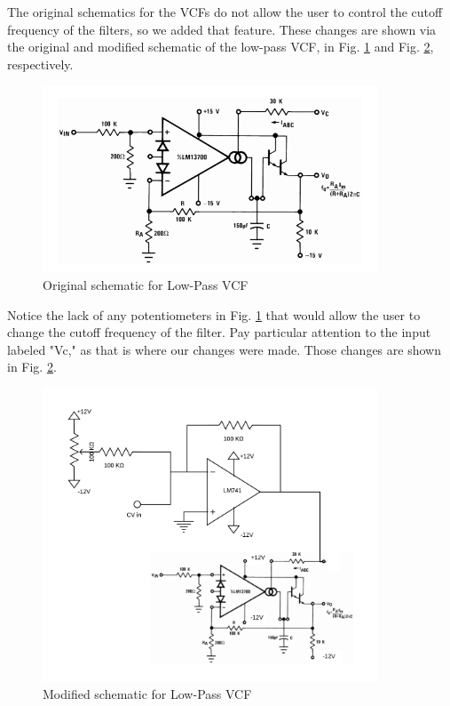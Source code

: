 \documentclass[letterpaper, 12 pt, conference]{ieeeconf}
\begin{document}
\begin{enumerate}
    The original schematics for the VCFs do not allow the user to control the cutoff frequency of the filters, so we added that feature. These changes are shown via the original and modified schematic of the low-pass VCF, in Fig. \ref{lpffig} and Fig. \ref{modlpffig}, respectively.
    
    \begin{figure}[ht]
    \includegraphics[width=10cm]{LPF}
    \centering
    \caption{Original schematic for Low-Pass VCF \cite{VCF}}
    \label{lpffig}
    \end{figure}
    
    Notice the lack of any potentiometers in Fig. \ref{lpffig} that would allow the user to change the cutoff frequency of the filter. Pay particular attention to the input labeled "Vc," as that is where our changes were made. Those changes are shown in Fig. \ref{modlpffig}.
    
    \begin{figure}[ht]
    \includegraphics[width=10cm]{modlpf}
    \centering
    \caption{Modified schematic for Low-Pass VCF}
    \label{modlpffig}
    \end{figure}
    

\end{enumerate}
\end{document}
